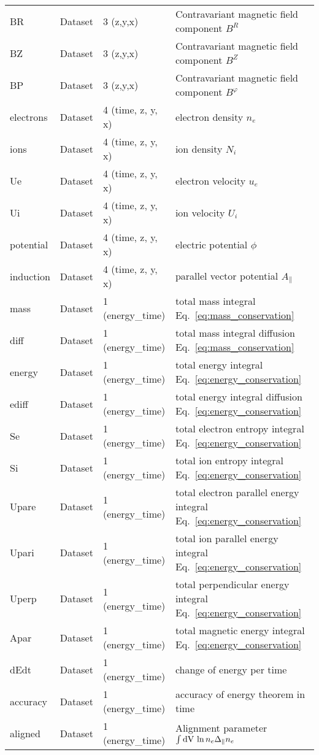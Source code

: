 \begin{longtable}{lll>{\RaggedRight}p{7cm}}
BR               & Dataset & 3 (z,y,x) & Contravariant magnetic field component $B^R$ \\
BZ               & Dataset & 3 (z,y,x) & Contravariant magnetic field component $B^Z$ \\
BP               & Dataset & 3 (z,y,x) & Contravariant magnetic field component $B^\varphi$ \\
electrons        & Dataset & 4 (time, z, y, x) & electron density $n_e$ \\
ions             & Dataset & 4 (time, z, y, x) & ion density $N_i$ \\
Ue               & Dataset & 4 (time, z, y, x) & electron velocity $u_e$ \\
Ui               & Dataset & 4 (time, z, y, x) & ion velocity $U_i$ \\
potential        & Dataset & 4 (time, z, y, x) & electric potential $\phi$ \\
induction        & Dataset & 4 (time, z, y, x) & parallel vector potential $A_\parallel$ \\
mass      & Dataset & 1 (energy\_time) & total mass integral Eq.~\eqref{eq:mass_conservation} \\
diff      & Dataset & 1 (energy\_time) & total mass integral diffusion Eq.~\eqref{eq:mass_conservation} \\
energy    & Dataset & 1 (energy\_time) & total energy integral Eq.~\eqref{eq:energy_conservation} \\
ediff     & Dataset & 1 (energy\_time) & total energy integral diffusion Eq.~\eqref{eq:energy_conservation} \\
Se        & Dataset & 1 (energy\_time) & total electron entropy integral Eq.~\eqref{eq:energy_conservation} \\
Si        & Dataset & 1 (energy\_time) & total ion entropy integral Eq.~\eqref{eq:energy_conservation} \\
Upare        & Dataset & 1 (energy\_time) & total electron parallel energy integral Eq.~\eqref{eq:energy_conservation} \\
Upari        & Dataset & 1 (energy\_time) & total ion parallel energy integral Eq.~\eqref{eq:energy_conservation} \\
Uperp     & Dataset & 1 (energy\_time) & total perpendicular energy integral Eq.~\eqref{eq:energy_conservation} \\
Apar     & Dataset & 1 (energy\_time) & total magnetic energy integral Eq.~\eqref{eq:energy_conservation} \\
dEdt      & Dataset & 1 (energy\_time) & change of energy per time  \\
accuracy  & Dataset & 1 (energy\_time) & accuracy of energy theorem in time  \\
aligned   & Dataset & 1 (energy\_time) & Alignment parameter $\int\mathrm{dV}\, \ln n_e\Delta_\parallel n_e$\\
\bottomrule
\end{longtable}
